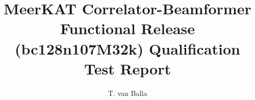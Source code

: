 \documentclass[11pt,english,twoside]{article}
\author{T. van Balla}
\begin{document}
\title{MeerKAT Correlator-Beamformer Functional Release  (bc128n107M32k) Qualification Test Report}
\makekatdocbeginning
\end{document}
